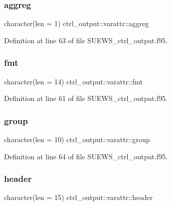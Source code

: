 \subsubsection{\texorpdfstring{aggreg}{aggreg}}
{\footnotesize\ttfamily character(len = 1) ctrl\+\_\+output\+::varattr\+::aggreg}



Definition at line 63 of file S\+U\+E\+W\+S\+\_\+ctrl\+\_\+output.\+f95.

\mbox{\label{structctrl__output_1_1varattr_a1939d217311a5e0fb5571efdc8df0f42}} 
\subsubsection{\texorpdfstring{fmt}{fmt}}
{\footnotesize\ttfamily character(len = 14) ctrl\+\_\+output\+::varattr\+::fmt}



Definition at line 61 of file S\+U\+E\+W\+S\+\_\+ctrl\+\_\+output.\+f95.

\mbox{\label{structctrl__output_1_1varattr_af5c0a029bc5b7de926c9f771ecbaa16e}} 
\subsubsection{\texorpdfstring{group}{group}}
{\footnotesize\ttfamily character(len = 10) ctrl\+\_\+output\+::varattr\+::group}



Definition at line 64 of file S\+U\+E\+W\+S\+\_\+ctrl\+\_\+output.\+f95.

\mbox{\label{structctrl__output_1_1varattr_ac5d564a1b51aca6652ee5999d86ee3c5}} 
\subsubsection{\texorpdfstring{header}{header}}
{\footnotesize\ttfamily character(len = 15) ctrl\+\_\+output\+::varattr\+::header}



